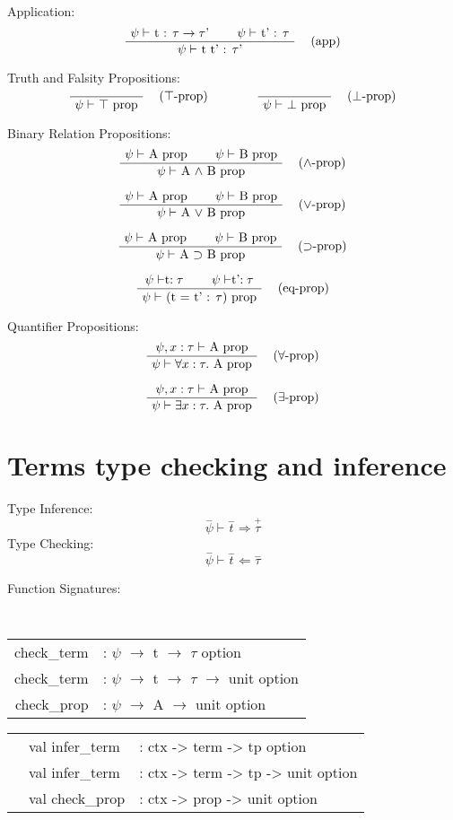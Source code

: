 \documentclass[twoside,a4paper]{article}
\begin{document}
Application:
\[
\AxiomC{$\psi \vdash$ t : $\tau \rightarrow \tau$'}
\AxiomC{$\psi \vdash$ t' : $\tau$}
\RightLabel{\quad (app)}
\BinaryInfC{$\psi \vdash$ t t' : $\tau$'}
\DisplayProof
\]

Truth and Falsity Propositions:
\[
\AxiomC{}
\RightLabel{\quad ($\top$-prop)}
\UnaryInfC{$\psi \vdash$ $\top$  prop}
\DisplayProof
\qquad
\qquad
\AxiomC{}
\RightLabel{\quad ($\bot$-prop)}
\UnaryInfC{$\psi \vdash$ $\bot$  prop}
\DisplayProof
\]

Binary Relation Propositions:
\[
\AxiomC{$\psi \vdash$ A prop}
\AxiomC{$\psi \vdash$ B prop}
\RightLabel{\quad ($\wedge$-prop)}
\BinaryInfC{$\psi \vdash$ A $\wedge$ B prop}
\DisplayProof
\]

\[
\AxiomC{$\psi \vdash$ A prop}
\AxiomC{$\psi \vdash$ B prop}
\RightLabel{\quad ($\vee$-prop)}
\BinaryInfC{$\psi \vdash$ A $\vee$ B prop}
\DisplayProof
\]

\[
\AxiomC{$\psi \vdash$ A prop}
\AxiomC{$\psi \vdash$ B prop}
\RightLabel{\quad ($\supset$-prop)}
\BinaryInfC{$\psi \vdash$ A $\supset$ B prop}
\DisplayProof
\]

\[
\AxiomC{$\psi \vdash $t$ : \tau$}
\AxiomC{$\psi \vdash $t'$ : \tau$}
\RightLabel{\quad (eq-prop)}
\BinaryInfC{$\psi \vdash$ (t = t' : $\tau$) prop}
\DisplayProof
\]

Quantifier Propositions:
\[
\AxiomC{$\psi , x : \tau \vdash$ A prop}
\RightLabel{\quad ($\forall$-prop)}
\UnaryInfC{$\psi \vdash \forall x : \tau .$ A prop}
\DisplayProof
\]

\[
\AxiomC{$\psi , x : \tau \vdash$ A prop}
\RightLabel{\quad ($\exists$-prop)}
\UnaryInfC{$\psi \vdash \exists x : \tau .$ A prop}
\DisplayProof
\]

\section{Terms type checking and inference}

Type Inference:
\[\overset{-}\psi \vdash \overset{-}{t} \Rightarrow \overset{+}\tau\]
Type Checking:
\[\overset{-}\psi \vdash \overset{-}{t} \Leftarrow \overset{-}\tau\]



Function Signatures:
\begin{center}
\tt
\begin{tabular} {rl}
check_term &: $\psi$ $\rightarrow$ t $\rightarrow$ $\tau$ option
\\
check_term &: $\psi$ $\rightarrow$ t $\rightarrow$ $\tau$ $\rightarrow$ unit option
\\
check_prop &: $\psi$ $\rightarrow$ A $\rightarrow$ unit option
\end{tabular}

\begin{tabular} {rll}

&val infer_term &: ctx -> term -> tp option
\\
&val infer_term &: ctx -> term -> tp -> unit option
\\
&val check_prop &: ctx -> prop -> unit option

\end{tabular}
\end{center}
\end{document}
